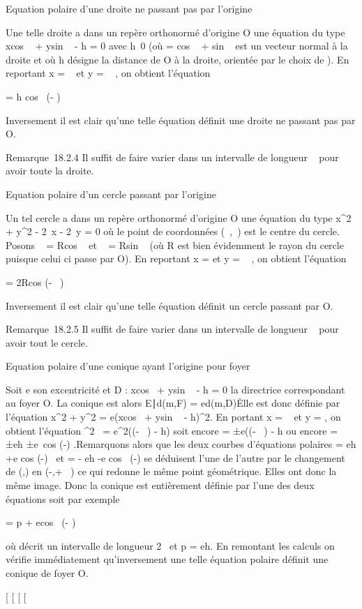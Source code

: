 Equation polaire d'une droite ne passant pas par l'origine

Une telle droite a dans un repère orthonormé d'origine O une équation du
type xcos ~ +
ysin ~ - h = 0 avec
h\neq~0 (où \vecn
= cos \vec\imath~
+ sin ~ est
un vecteur normal à la droite et où h désigne la distance de O à la
droite, orientée par le choix de \vecn). En reportant
x = \rhocos~ \theta et y =
\rhosin~ \theta, on obtient l'équation

\rho = h \over cos~ (\theta -
)

Inversement il est clair qu'une telle équation définit une droite ne
passant pas par O.

Remarque~18.2.4 Il suffit de faire varier \theta dans un intervalle de
longueur \pi~ pour avoir toute la droite.

Equation polaire d'un cercle passant par l'origine

Un tel cercle a dans un repère orthonormé d'origine O une équation du
type x^2 + y^2 - 2\alpha~x - 2\beta~y = 0 où le point \Omega de
coordonnées (\alpha~,\beta~) est le centre du cercle. Posons \alpha~ =
Rcos ~ et \beta~ =
Rsin ~ (où R est bien évidemment le
rayon du cercle puisque celui ci passe par O). En reportant x =
\rhocos \theta et y = \rho\sin~
\theta, on obtient l'équation

\rho = 2Rcos (\theta - ~)

Inversement il est clair qu'une telle équation définit un cercle passant
par O.

Remarque~18.2.5 Il suffit de faire varier \theta dans un intervalle de
longueur \pi~ pour avoir tout le cercle.

Equation polaire d'une conique ayant l'origine pour foyer

Soit e son excentricité et D : xcos~
 + ysin ~ - h = 0 la
directrice correspondant au foyer O. La conique est alors
\m \in E∣d(m,F) =
ed(m,D)\. Elle est donc définie par l'équation
x^2 + y^2 = e(xcos~
 + ysin ~ -
h)^2. En portant x = \rhocos~ \theta et y =
\rhosin \theta, on obtient l'équation \rho^2~ =
e^2(\rhocos (\theta - ~) - h)
soit encore \rho = ±e(\rhocos (\theta - ~) - h
ou encore \rho = ±eh ±e\
cos (\theta-) .Remarquons alors que les deux courbes
d'équations polaires \rho = eh +e cos (\theta-)~ et \rho = - eh
\over 1-e cos~
(\theta-) se déduisent l'une de l'autre par le changement de
(\rho,\theta) en (-\rho,\theta + \pi~) ce qui redonne le même point géométrique. Elles ont
donc la même image. Donc la conique est entièrement définie par l'une
des deux équations soit par exemple

\rho = p  + ecos~ (\theta -
)

où \theta décrit un intervalle de longueur 2\pi~ et p = eh. En remontant les
calculs on vérifie immédiatement qu'inversement une telle équation
polaire définit une conique de foyer O.

{[}
{[}
{[}
{[}
